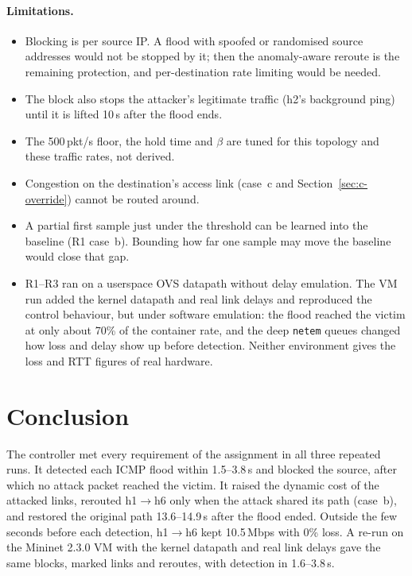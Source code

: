 \documentclass[11pt,a4paper]{article}
\newcommand{\ra}{\ensuremath{\rightarrow}}
\newcommand{\code}[1]{\texttt{#1}}
\begin{document}
\paragraph{Limitations.}
\begin{itemize}
  \item Blocking is per source IP. A flood with spoofed or randomised source addresses would not be stopped by
        it; then the anomaly-aware reroute is the remaining protection, and per-destination rate limiting would
        be needed.
  \item The block also stops the attacker's legitimate traffic (h2's background ping) until it is lifted 10\,s
        after the flood ends.
  \item The 500\,pkt/s floor, the hold time and $\beta$ are tuned for this topology and these traffic rates, not
        derived.
  \item Congestion on the destination's access link (case~c and Section~\ref{sec:c-override}) cannot be routed
        around.
  \item A partial first sample just under the threshold can be learned into the baseline (R1 case~b). Bounding
        how far one sample may move the baseline would close that gap.
  \item R1--R3 ran on a userspace OVS datapath without delay emulation. The VM run added the kernel datapath and
        real link delays and reproduced the control behaviour, but under software emulation: the flood reached
        the victim at only about 70\% of the container rate, and the deep \code{netem} queues changed how loss
        and delay show up before detection. Neither environment gives the loss and RTT figures of real
        hardware.
\end{itemize}

\section{Conclusion}

The controller met every requirement of the assignment in all three repeated runs. It detected each ICMP flood
within 1.5--3.8\,s and blocked the source, after which no attack packet reached the victim. It raised the dynamic
cost of the attacked links, rerouted h1\ra h6 only when the attack shared its path (case~b), and restored the
original path 13.6--14.9\,s after the flood ended. Outside the few seconds before each detection, h1\ra h6 kept
10.5\,Mbps with 0\% loss. A re-run on the Mininet 2.3.0 VM with the kernel datapath and real link delays gave the
same blocks, marked links and reroutes, with detection in 1.6--3.8\,s.
\end{document}
